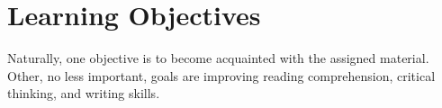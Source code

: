 
\section{Learning Objectives}

Naturally, one objective is to become acquainted with the assigned material. Other, no less important, goals are improving reading comprehension, critical thinking, and writing skills.